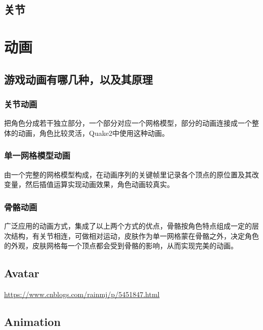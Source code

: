 \documentclass[UTF8,a4paper,12pt]{ctexbook}
\begin{document}
	\section{关节}
		
\chapter{动画}
	\section{游戏动画有哪几种，以及其原理}
		\subsection{关节动画}
			把角色分成若干独立部分，一个部分对应一个网格模型，部分的动画连接成一个整体的动画，角色比较灵活，Quake2中使用这种动画。 
			
		\subsection{单一网格模型动画}
			由一个完整的网格模型构成，在动画序列的关键帧里记录各个顶点的原位置及其改变量，然后插值运算实现动画效果，角色动画较真实。   
			
		\subsection{骨骼动画}
			广泛应用的动画方式，集成了以上两个方式的优点，骨骼按角色特点组成一定的层次结构，有关节相连，可做相对运动，皮肤作为单一网格蒙在骨骼之外，决定角色的外观，皮肤网格每一个顶点都会受到骨骼的影响，从而实现完美的动画。
	
	\section{Avatar}
	
		\url{https://www.cnblogs.com/rainmj/p/5451847.html}
		
	\section{Animation}
		
\end{document}
